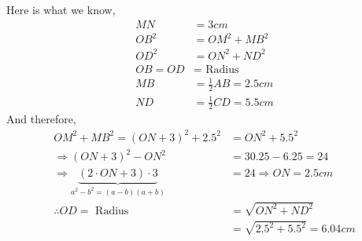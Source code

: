 \begin{solution}[\halfpage]
	Here is what we know,
	\begin{align}
		MN &= 3cm \\
		OB^2 &= OM^2 + MB^2 \\
		OD^2 &= ON^2 + ND^2 \\
		OB = OD &= \text{ Radius } \\
		MB &= \frac{1}{2}AB = 2.5cm \\
		ND &= \frac{1}{2}CD = 5.5cm
	\end{align}
	And therefore, 
	\begin{align}
		OM^2 + MB^2 = (ON + 3)^2 + 2.5^2 &= ON^2 + 5.5^2 \\
		\Rightarrow (ON+3)^2 - ON^2 &= 30.25 - 6.25 = 24 \\
		\Rightarrow \underbrace{(2\cdot ON + 3)\cdot 3}_{a^2-b^2 = (a-b)(a+b)} &= 24 \Rightarrow ON = 2.5cm \\
		\therefore OD = \text{ Radius } &= \sqrt{ON^2 + ND^2} \\ 
		&= \sqrt{2.5^2 + 5.5^2} = 6.04cm
	\end{align}
\end{solution}

